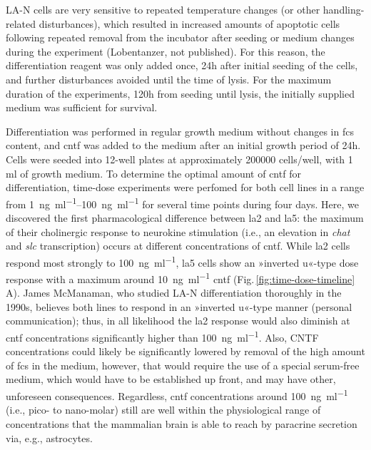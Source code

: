 \begin{method}
LA-N cells are very sensitive to repeated temperature changes (or other handling-related disturbances), which resulted in increased amounts of apoptotic cells following repeated removal from the incubator after seeding or medium changes during the experiment (Lobentanzer, not published). For this reason, the differentiation reagent was only added once, 24h after initial seeding of the cells, and further disturbances avoided until the time of lysis. For the maximum duration of the experiments, 120h from seeding until lysis, the initially supplied medium was sufficient for survival.

Differentiation was performed in regular growth medium without changes in \ac{fcs} content, and \ac{cntf} was added to the medium after an initial growth period of 24h. Cells were seeded into 12-well plates at approximately \num{200000} cells/well, with 1 ml of growth medium. To determine the optimal amount of \ac{cntf} for differentiation, time-dose experiments were perfomed for both cell lines in a range from \SIrange{1}{100}{\nano\gram\per\milli\litre} for several time points during four days. Here, we discovered the first pharmacological difference between \ac{la2} and \ac{la5}: the maximum of their cholinergic response to neurokine stimulation (i.e., an elevation in \textit{\ac{chat}} and \textit{\ac{slc}} transcription) occurs at different concentrations of \ac{cntf}. While \ac{la2} cells respond most strongly to \SI{100}{\nano\gram\per\milli\litre}, \ac{la5} cells show an »inverted u«-type dose response with a maximum around \SI{10}{\nano\gram\per\milli\litre} \ac{cntf} (Fig.\,\ref{fig:time-dose-timeline}\,A). James McManaman, who studied LA-N differentiation thoroughly in the 1990s,\cite{McManaman1991} believes both lines to respond in an »inverted u«-type manner (personal communication); thus, in all likelihood the \ac{la2} response would also diminish at \ac{cntf} concentrations significantly higher than \SI{100}{\nano\gram\per\milli\litre}. Also, CNTF concentrations could likely be significantly lowered by removal of the high amount of \ac{fcs} in the medium, however, that would require the use of a special serum-free medium, which would have to be established up front, and may have other, unforeseen consequences. Regardless, \ac{cntf} concentrations around \SI{100}{\nano\gram\per\milli\litre} (i.e., pico- to nano-molar) still are well within the physiological range of concentrations that the mammalian brain is able to reach by paracrine secretion via, e.g., astrocytes.\cite{Sun2016}

\end{method}


